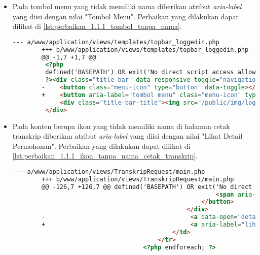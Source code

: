 \begin{itemize}
    \item Pada tombol menu yang tidak memiliki nama diberikan atribut \textit{aria-label} yang diisi dengan nilai "Tombol Menu". Perbaikan yang dilakukan dapat dilihat di \ref{lst:perbaikan_1.1.1_tombol_tanpa_nama}.
    \begin{lstlisting}[frame=single, label={lst:perbaikan_1.1.1_tombol_tanpa_nama}, language=HTML, caption=Perbaikan Kriteria Sukses 1.1.1 - Tombol Tanpa Nama]
        --- a/www/application/views/templates/topbar_loggedin.php
        +++ b/www/application/views/templates/topbar_loggedin.php
        @@ -1,7 +1,7 @@
         <?php
         defined('BASEPATH') OR exit('No direct script access allowed');
         ?><div class="title-bar" data-responsive-toggle="navigation-menu" data-hide-for="medium">
        -    <button class="menu-icon" type="button" data-toggle></button>
        +    <button aria-label="tombol menu" class="menu-icon" type="button" data-toggle></button>
             <div class="title-bar-title"><img src="/public/img/logo.png" class="textsized" alt="B"/></div>
         </div>
    \end{lstlisting}

    \item Pada konten berupa ikon yang tidak memiliki nama di halaman cetak transkrip diberikan atribut \textit{aria-label} yang diisi dengan nilai "Lihat Detail Permohonan". Perbaikan yang dilakukan dapat dilihat di \ref{lst:perbaikan_1.1.1_ikon_tanpa_nama_cetak_transkrip}.
    \begin{lstlisting}[frame=single, label={lst:perbaikan_1.1.1_ikon_tanpa_nama_cetak_transkrip}, language=HTML, caption=Perbaikan Kriteria Sukses 1.1.1 - Ikon Tanpa Nama di Halaman Cetak Transkrip]
        --- a/www/application/views/TranskripRequest/main.php
        +++ b/www/application/views/TranskripRequest/main.php
        @@ -126,7 +126,7 @@ defined('BASEPATH') OR exit('No direct script access allowed');
                                                        <span aria-hidden="true">&times;</span>
                                                    </button>
                                                </div>
        -                                        <a data-open="detail<?= $request->id ?>"><i class="fi-eye"></i></a>
        +                                        <a aria-label="lihat detail permohonan" data-open="detail<?= $request->id ?>"><i class="fi-eye"></i></a>
                                            </td>
                                        </tr>
                                    <?php endforeach; ?>
    \end{lstlisting}


\end{itemize}
